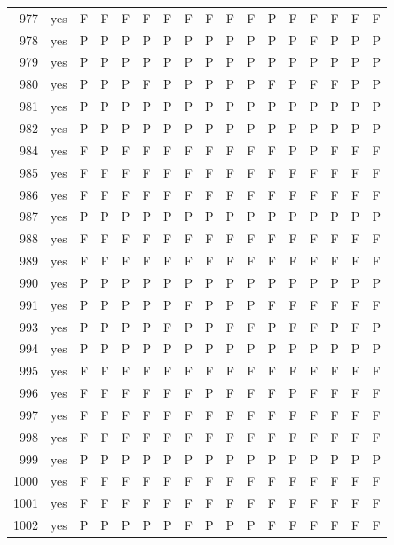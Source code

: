 \begin{table}[p]
\begin{tabular*}{\textwidth}{@{\extracolsep{\fill}}rcccccccccccccccc}
977 & yes & F & F & F & F & F & F & F & F & F & P & F & F & F & F & F\\
978 & yes & P & P & P & P & P & P & P & P & P & P & P & F & P & P & P\\
979 & yes & P & P & P & P & P & P & P & P & P & P & P & P & P & P & P\\
980 & yes & P & P & P & F & P & P & P & P & P & F & P & F & F & P & P\\
981 & yes & P & P & P & P & P & P & P & P & P & P & P & P & P & P & P\\
982 & yes & P & P & P & P & P & P & P & P & P & P & P & P & P & P & P\\
984 & yes & F & P & F & F & F & F & F & F & F & F & P & P & F & F & F\\
985 & yes & F & F & F & F & F & F & F & F & F & F & F & F & F & F & F\\
986 & yes & F & F & F & F & F & F & F & F & F & F & F & F & F & F & F\\
987 & yes & P & P & P & P & P & P & P & P & P & P & P & P & P & P & P\\
988 & yes & F & F & F & F & F & F & F & F & F & F & F & F & F & F & F\\
989 & yes & F & F & F & F & F & F & F & F & F & F & F & F & F & F & F\\
990 & yes & P & P & P & P & P & P & P & P & P & P & P & P & P & P & P\\
991 & yes & P & P & P & P & P & F & P & P & P & F & F & F & F & F & F\\
993 & yes & P & P & P & P & F & P & P & F & F & P & F & F & P & F & P\\
994 & yes & P & P & P & P & P & P & P & P & P & P & P & P & P & P & P\\
995 & yes & F & F & F & F & F & F & F & F & F & F & F & F & F & F & F\\
996 & yes & F & F & F & F & F & F & P & F & F & F & P & F & F & F & F\\
997 & yes & F & F & F & F & F & F & F & F & F & F & F & F & F & F & F\\
998 & yes & F & F & F & F & F & F & F & F & F & F & F & F & F & F & F\\
999 & yes & P & P & P & P & P & P & P & P & P & P & P & P & P & P & P\\
1000 & yes & F & F & F & F & F & F & F & F & F & F & F & F & F & F & F\\
1001 & yes & F & F & F & F & F & F & F & F & F & F & F & F & F & F & F\\
1002 & yes & P & P & P & P & P & F & P & P & P & F & F & F & F & F & F\\
\bottomrule\end{tabular*}\end{table}
\clearpage

